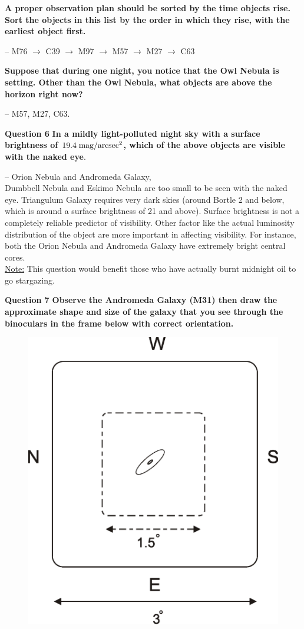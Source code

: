 \documentclass[a4paper,12pt]{extarticle}
\begin{document}
\textbf{A proper observation plan should be sorted by the time objects rise. Sort the objects in this list by the order in which they rise, with the earliest object first.}
\begin{sol}
-- M76 $\rightarrow$ C39 $\rightarrow$ M97 $\rightarrow$ M57 $\rightarrow$ M27 $\rightarrow$ C63	
\end{sol}

\textbf{Suppose that during one night, you notice that the Owl Nebula is
setting. Other than the Owl Nebula, what objects are above the
horizon right now?}
\begin{sol}
-- M57, M27, C63.	
\end{sol}

\textsf{\textbf{Question 6}} \textbf{In a mildly light-polluted night sky with a surface brightness of $19.4\; \rm mag/arcsec^2$, which of the above objects are visible with the naked eye}.
\begin{sol}
	-- Orion Nebula and Andromeda Galaxy,\\
	
	Dumbbell Nebula and Eskimo Nebula are too small to be seen with the naked eye. Triangulum Galaxy requires very dark skies (around Bortle 2 and below, which is around a surface brightness of 21 and above). Surface brightness is not a completely reliable predictor of visibility. Other factor like the actual luminosity distribution of the object are more important in affecting visibility. For instance, both the Orion Nebula and Andromeda Galaxy have extremely bright central cores.\\
	
	\underline{Note:} This question would benefit those who have actually burnt midnight oil to go stargazing.
\end{sol}


\textsf{\textbf{Question 7}} \textbf{Observe the Andromeda Galaxy (M31) then draw the approximate shape and size of the galaxy that you see through the binoculars in the frame below with correct orientation.}
\begin{figure}[H]
	\centering
	\includegraphics[width=0.3\linewidth]{andromedasize.eps}
\end{figure}
\end{document}
